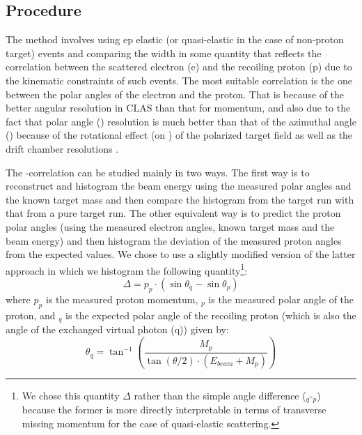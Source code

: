 \subsection{Procedure}
The method involves using ep elastic (or quasi-elastic in the case of non-proton target) events and comparing the width %
in some quantity that reflects the correlation between the scattered electron (e) and the recoiling proton (p) due to the kinematic constraints of such events. %
The most suitable correlation is the one between the polar angles of the electron and the proton. That is because of the better angular resolution in CLAS than that for momentum, and also due to the fact that polar angle (\thns) resolution is much better than that of the azimuthal angle (\phns) because of the rotational effect (on %
\phns) of the polarized target field as well as the drift chamber resolutions \cite{bostedD2Cont}.

The \thns-correlation can be studied mainly in two ways. The first way is to reconstruct and histogram the beam energy using the measured polar angles and the known target mass and then compare the histogram from the  target run with that from a pure  target run. %
The other equivalent way is to predict the proton polar angles (using the measured electron angles, known target mass and the beam energy) and then histogram the deviation of the measured proton angles from the expected values. We chose to use a slightly modified %
version of the latter approach %
in which we histogram the following quantity\footnote{We chose this quantity $\Delta$ rather than the simple angle difference (\thns$_q$-\thns$_p$) because the former is more %
directly interpretable in terms of transverse missing momentum for the case of quasi-elastic scattering.}: %
\begin{equation}
\Delta = p_p\cdot(\sin\theta_q - \sin\theta_p)
\label{pDsinTh}
\end{equation}
where $p_p$ is the measured proton momentum, \thns$_p$ is the measured polar angle of the proton, and \thns$_q$ is the expected polar angle of the recoiling proton (which is also the angle of the exchanged virtual photon (q)) given by:
\begin{equation}
\theta_q = \tan^{-1}\left(\frac{M_p}{\tan(\theta/2)\cdot(E_{beam}+M_p)} \right)%
\label{thQ}
\end{equation}

